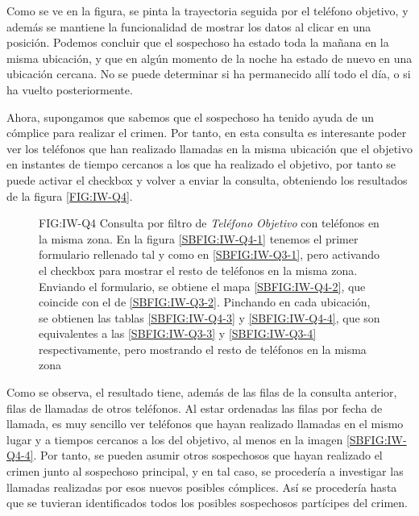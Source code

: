     Como se ve en la figura, se pinta la trayectoria seguida por el teléfono objetivo, y además se mantiene la funcionalidad de mostrar los datos al clicar en una posición. 
    Podemos concluir que el sospechoso ha estado toda la mañana en la misma ubicación, y que en algún momento de la noche ha estado de nuevo en una ubicación cercana. 
    No se puede determinar si ha permanecido allí todo el día, o si ha vuelto posteriormente.
    
    Ahora, supongamos que sabemos que el sospechoso ha tenido ayuda de un cómplice para realizar el crimen. Por tanto, en esta consulta es interesante poder ver los teléfonos que han realizado llamadas en la misma ubicación que el objetivo en instantes de tiempo cercanos a los que ha realizado el objetivo, por tanto se puede activar el checkbox y volver a enviar la consulta, obteniendo los resultados de la figura \ref{FIG:IW-Q4}. 
    
    \begin{figure}[Consulta por filtro de \textit{Teléfono Objetivo} con teléfonos en la misma zona]{FIG:IW-Q4}
      {Consulta por filtro de \textit{Teléfono Objetivo} con teléfonos en la misma zona. En la figura \ref{SBFIG:IW-Q4-1} tenemos el primer formulario rellenado tal y como en \ref{SBFIG:IW-Q3-1}, pero activando el checkbox para mostrar el resto de teléfonos en la misma zona. Enviando el formulario, se obtiene el mapa \ref{SBFIG:IW-Q4-2}, que coincide con el de \ref{SBFIG:IW-Q3-2}. Pinchando en cada ubicación, se obtienen las tablas \ref{SBFIG:IW-Q4-3} y \ref{SBFIG:IW-Q4-4}, que son equivalentes a las \ref{SBFIG:IW-Q3-3} y \ref{SBFIG:IW-Q3-4} respectivamente, pero mostrando el resto de teléfonos en la misma zona}
      \quad
      \quad
      \quad
    \end{figure}
    
    Como se observa, el resultado tiene, además de las filas de la consulta anterior, filas de llamadas de otros teléfonos.
    Al estar ordenadas las filas por fecha de llamada, es muy sencillo ver teléfonos que hayan realizado llamadas en el mismo lugar y a tiempos cercanos a los del objetivo, al menos en la imagen \ref{SBFIG:IW-Q4-4}. Por tanto, se pueden asumir otros sospechosos que hayan realizado el crimen junto al sospechoso principal, y en tal caso, se procedería a investigar las llamadas realizadas por esos nuevos posibles cómplices. Así se procedería hasta que se tuvieran identificados todos los posibles sospechosos partícipes del crimen.